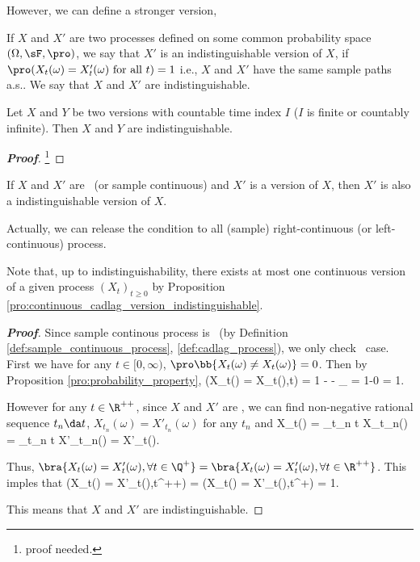 However, we can define a stronger version,

\begin{definition}\label{def:indistinguishable_version_process}
If $X$ and $X'$ are two processes defined on some common probability space $(\Omega,\sF,\pro)$, we say that $X'$ is an indistinguishable version of $X$, if $\pro(X_t(\omega) = X'_t(\omega) \text{ for all }t) = 1$ i.e., $X$ and $X'$ have the same sample paths a.s.. We say that $X$ and $X'$ are indistinguishable.
\end{definition}

\begin{proposition}
Let $X$ and $Y$ be two versions with countable time index $I$ ($I$ is finite or countably infinite). Then $X$ and $Y$ are indistinguishable.
\end{proposition}

\begin{proof}[\bf Proof]
\footnote{proof needed.}
\end{proof}

\begin{proposition}\label{pro:continuous_cadlag_version_indistinguishable}
If $X$ and $X'$ are \cadlag\ (or sample continuous) and $X'$ is a version of $X$, then $X'$ is also a indistinguishable version of $X$.
\end{proposition}

\begin{remark}
Actually, we can release the condition to all (sample) right-continuous (or left-continuous) process.

Note that, up to indistinguishability, there exists at most one continuous version of a given process $(X_t)_{t \geq 0}$ by Proposition \ref{pro:continuous_cadlag_version_indistinguishable}.
\end{remark}

\begin{proof}[\bf Proof]
Since sample continous process is \cadlag\ (by Definition \ref{def:sample_continuous_process}, \ref{def:cadlag_process}), we only check \cadlag\ case. First we have for any $t\in [0,\infty)$, $\pro\bb{X_t(\omega) \neq
X_t(\omega)} = 0$. Then by Proposition \ref{pro:probability_property}, \be \pro(X_t(\omega) = X_t(\omega),\forall t\in \Q) = 1 - \pro{}  - _{} = 1-0 = 1. \ee

However for any $t\in \R^{++}$, since $X$ and $X'$ are \cadlag, we can find non-negative rational sequence $t_n \da t$, $X_{t_n}(\omega) = X'_{t_n}(\omega)$ for any $t_n$ and
\be
X_t(\omega) = \lim_{t_n \da t} X_{t_n}(\omega) = \lim_{t_n \da t} X'_{t_n}(\omega) = X'_t(\omega).
\ee

Thus, $\bra{X_t(\omega) = X'_t(\omega),\forall t\in \Q^+} = \bra{X_t(\omega) = X'_t(\omega),\forall t\in \R^{++}}$. This imples that
\be
\pro(X_t(\omega) = X'_t(\omega),\forall t\in \R^{++})  = \pro(X_t(\omega) = X'_t(\omega),\forall t\in \Q^+) = 1.
\ee

This means that $X$ and $X'$ are indistinguishable.
\end{proof}

